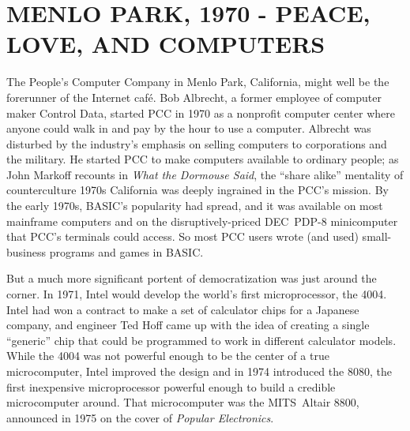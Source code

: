 
\section{MENLO PARK, 1970 - PEACE, LOVE, AND COMPUTERS}



The People's Computer Company in Menlo Park, California, 
might well be the forerunner of the Internet caf\'{e}.
Bob Albrecht, a former employee of computer maker Control Data, started PCC
in 1970
as a nonprofit computer center where anyone could walk in and pay
by the hour to use a computer.
Albrecht was disturbed by
the industry's emphasis on selling computers to corporations and
the military.
He started PCC to make computers available to ordinary people;
as John Markoff recounts in \emph{What the Dormouse Said}, the
``share alike'' mentality of counterculture 1970s California was
deeply ingrained in the PCC's mission.
By the early 1970s, BASIC's popularity had spread, 
and it was available on most mainframe computers and on the
disruptively-priced DEC~PDP-8 minicomputer that PCC's terminals could access.
So most PCC users wrote (and used) small-business programs
and games in BASIC.


But a much more significant portent of democratization was just around
the corner.
In 1971, Intel would develop the world's first microprocessor, the
4004.  Intel had won a contract to make a set of calculator chips for a
Japanese company, and engineer Ted Hoff came up with the idea of
creating a single ``generic'' chip that could be programmed to work in
different calculator models.  While the 4004 was not powerful enough to
be the center of a true microcomputer, Intel improved the design and in 
1974 introduced the 8080, the first inexpensive microprocessor powerful
enough to build a credible microcomputer around.  
That microcomputer was the MITS~Altair 8800, announced in 1975 
on the cover of \emph{Popular Electronics}.

